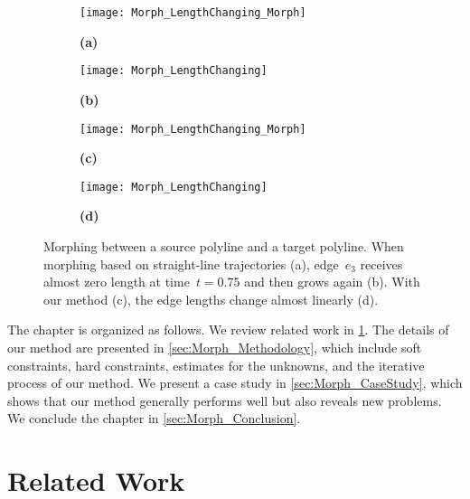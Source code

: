 \begin{figure}[tb]
	\captionsetup[subfigure]
	{justification=centering,font=normalsize}
	\begin{subfigure}[b]{.49\textwidth}
		\centering
		\texttt{[image: Morph\_LengthChanging\_Morph]}
		\caption{\textbf{(a)}}
	\end{subfigure}
	\hfill
	\begin{subfigure}[b]{.49\textwidth}
		\centering
		\texttt{[image: Morph\_LengthChanging]}
		\caption{\textbf{(b)}}
	\end{subfigure}

\bigskip
	\begin{subfigure}[b]{.49\textwidth}
	\centering
	\texttt{[image: Morph\_LengthChanging\_Morph]}
	\caption{\textbf{(c)}}
\end{subfigure}
\hfill
\begin{subfigure}[b]{.49\textwidth}
	\centering
	\texttt{[image: Morph\_LengthChanging]}
	\caption{\textbf{(d)}}
\end{subfigure}
	\caption{Morphing between 
		a source polyline and a target polyline.
		When morphing based on straight-line trajectories (a), 
		edge~$e_3$ receives almost zero length 
		at time~$t=0.75$ and then grows again (b). 
		With our method (c), 
		the edge lengths change almost linearly (d).}
	\label{fig:Morph_LengthChanging}
\end{figure}

The chapter is organized as follows. 
We review related work in 
\sect\ref{sec:Morph_RelatedWork}. 
The details of our method are presented in 
\sect\ref{sec:Morph_Methodology}, 
which include soft constraints, hard constraints, 
estimates for the unknowns, 
and the iterative process of our method. 
We present a case study in 
\sect\ref{sec:Morph_CaseStudy}, 
which shows that our 
method generally performs well but also reveals new problems. 
We conclude the chapter in 
\sect\ref{sec:Morph_Conclusion}.

\section{Related Work}
\label{sec:Morph_RelatedWork}

